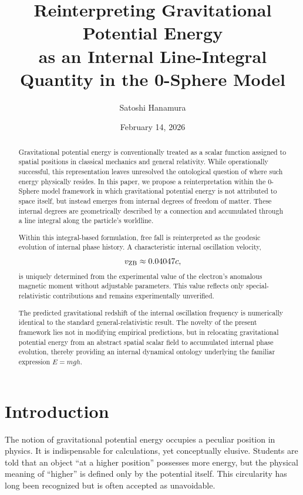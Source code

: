 \documentclass[%
 reprint,
 amsmath,amssymb,
 aps,
 prb,
]{revtex4-2}
\numberwithin{equation}{section}
\begin{document}
\title{Reinterpreting Gravitational Potential Energy \\as an Internal Line-Integral Quantity in the 0-Sphere Model}
\author{Satoshi Hanamura}
\date{February 14, 2026}

\begin{abstract}
Gravitational potential energy is conventionally treated as a scalar function assigned to spatial positions in classical mechanics and general relativity. While operationally successful, this representation leaves unresolved the ontological question of where such energy physically resides. In this paper, we propose a reinterpretation within the 0-Sphere model framework in which gravitational potential energy is not attributed to space itself, but instead emerges from internal degrees of freedom of matter. These internal degrees are geometrically described by a connection and accumulated through a line integral along the particle's worldline.

Within this integral-based formulation, free fall is reinterpreted as the geodesic evolution of internal phase history. A characteristic internal oscillation velocity,
\[
v_{\rm ZB} \approx 0.04047c,
\]
is uniquely determined from the experimental value of the electron's anomalous magnetic moment without adjustable parameters. This value reflects only special-relativistic contributions and remains experimentally unverified.

The predicted gravitational redshift of the internal oscillation frequency is numerically identical to the standard general-relativistic result. The novelty of the present framework lies not in modifying empirical predictions, but in relocating gravitational potential energy from an abstract spatial scalar field to accumulated internal phase evolution, thereby providing an internal dynamical ontology underlying the familiar expression $E = mgh$.
\end{abstract}


\maketitle

\section{Introduction}

The notion of gravitational potential energy occupies a peculiar position in physics. It is indispensable for calculations, yet conceptually elusive. Students are told that an object ``at a higher position'' possesses more energy, but the physical meaning of ``higher'' is defined only by the potential itself. This circularity has long been recognized but is often accepted as unavoidable.
\end{document}
